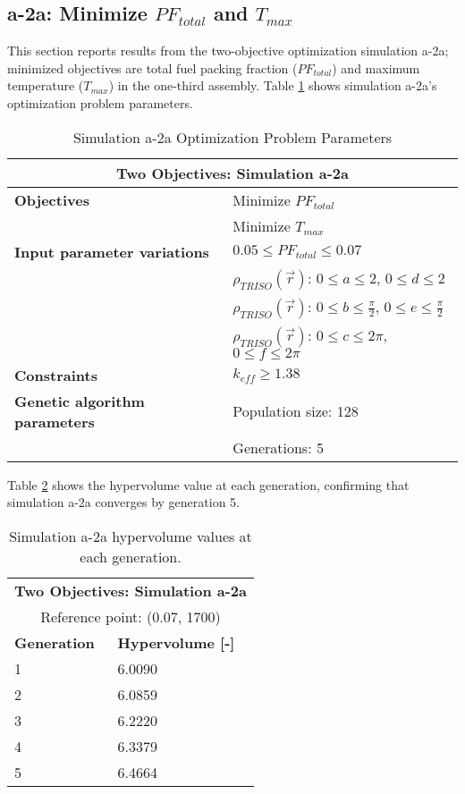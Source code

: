 \subsection{a-2a: Minimize $PF_{total}$ and $T_{max}$}
\label{sec:a-2a}
This section reports results from the two-objective optimization simulation a-2a;
minimized objectives are total fuel packing fraction ($PF_{total}$) and maximum 
temperature ($T_{max}$) in the one-third assembly.  
Table \ref{tab:simulationa2a} shows simulation a-2a's optimization problem parameters. 
\begin{table}[htbp!]
    \centering
    \onehalfspacing
    \caption{Simulation a-2a Optimization Problem Parameters}
	\label{tab:simulationa2a}
    \footnotesize
    \begin{tabular}{l|p{5.3cm}}
    \hline 
    \multicolumn{2}{c}{\textbf{Two Objectives: Simulation a-2a}} \\
    \hline 
    \textbf{Objectives} & Minimize $PF_{total}$ \\
    & Minimize $T_{max}$ \\
    \hline 
    \textbf{Input parameter variations} & $0.05 \leq PF_{total} \leq 0.07$ \\
    & $\rho_{TRISO}(\vec{r})$: $0 \leq a \leq 2$, $0 \leq d \leq 2$\\
    & $\rho_{TRISO}(\vec{r})$: $0 \leq b \leq \frac{\pi}{2}$, $0 \leq e \leq \frac{\pi}{2}$\\
    & $\rho_{TRISO}(\vec{r})$: $0 \leq c \leq 2\pi$, $0 \leq f \leq 2\pi$\\
    \hline
    \textbf{Constraints} & $k_{eff} \geq 1.38$\\ 
    \hline 
    \textbf{Genetic algorithm parameters} & Population size: 128 \\
    & Generations: 5 \\
    \hline
    \end{tabular}
\end{table}

Table \ref{tab:a2a-hypervolume} shows the hypervolume value at each generation, 
confirming that simulation a-2a converges by generation 5. 
\begin{table}[htbp!]
    \centering
    \onehalfspacing
    \caption{Simulation a-2a hypervolume values at each generation.}
	\label{tab:a2a-hypervolume}
    \footnotesize
    \begin{tabular}{ll}
    \hline 
    \multicolumn{2}{c}{\textbf{Two Objectives: Simulation a-2a}} \\
    \multicolumn{2}{c}{Reference point: (0.07, 1700)} \\
    \hline 
    \textbf{Generation} & \textbf{Hypervolume [-]} \\
    \hline
    1 & 6.0090 \\
    2 & 6.0859 \\
    3 & 6.2220 \\
    4 & 6.3379 \\
    5 & 6.4664 \\
    \hline
    \end{tabular}
\end{table}

